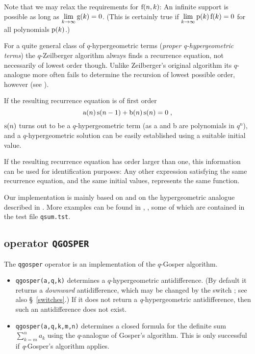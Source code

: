 Note that we may relax the requirements for ${\mathrm f}(n,k)$:
An infinite support is possible as long as
$\lim\limits_{k\rightarrow\infty}{{\mathrm g}(k)}=0$.
(This is certainly true if
$\lim\limits_{k\rightarrow\infty}{{\mathrm p}(k)\,{\mathrm f}(k)}=0$ for
all polynomials ${\mathrm p}(k)$.)

For a quite general class of $q$-hypergeometric terms
({\sl proper q-hypergeometric terms}) the $q$-Zeilberger algorithm
always finds a recurrence equation, not necessarily of lowest
order though. Unlike Zeilberger's original algorithm its
$q$-analogue more often fails to determine the recursion of
lowest possible order, however (see \cite{PauleRiese:95}).

If the resulting recurrence equation is of first order
\[
	{\mathrm a}(n)\,{\mathrm s}(n-1)+{\mathrm b}(n)\,{\mathrm s}(n)=0
\;,
\]
${\mathrm s}(n)$ turns out to be a $q$-hypergeometric term
(as a and b are polynomials in $q^n$),
and a $q$-hypergeometric solution can be easily established using a
suitable initial value.

If the resulting recurrence equation has order larger than one,
this information can be used for identification purposes:
Any other expression satisfying the same recurrence equation, and the same
initial values, represents the same function.

Our implementation is mainly based on \cite{Koornwinder:93} and on the
hypergeometric analogue described in \cite{Koepf:95e}.
More examples can be found in \cite{GasperRahman:90}, \cite{Gasper:95},
some of which are contained in the test file
\texttt{qsum.tst}.


\subsection{\REDUCE{} operator \texttt{QGOSPER}}
\label{reduce_qgosper}

The \texttt{qgosper} operator is an implementation of the $q$-Gosper
algorithm.
\begin{itemize}
	\item \texttt{qgosper(a,q,k)} determines a $q$-hypergeometric
		antidifference. (By default it returns a \textsl{downward}
		antidifference, which may be changed by the switch
		; see also
		\S~\ref{switches}.)
		If it does not return a \textsl{q}-hypergeometric antidifference,
		then such an antidifference does not exist.
	\item \texttt{qgosper(a,q,k,m,n)} determines a closed formula
		for the definite sum $\sum\limits_{k=m}^n a_k$ using the
		$q$-analogue of Gosper's algorithm.
		This is only successful if \textsl{q}-Gosper's algorithm applies.
\end{itemize}


